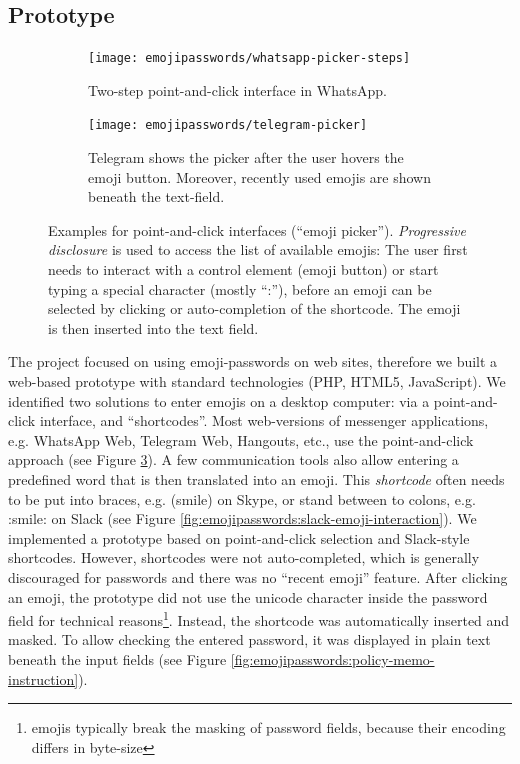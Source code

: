 \subsection{Prototype}
\begin{figure}
	\centering
	\begin{subfigure}[t]{0.49\textwidth}
		\texttt{[image: emojipasswords/whatsapp-picker-steps]}
		\caption{\label{fig:emojipasswords:whatsapp-point-and-click}Two-step point-and-click interface  in WhatsApp.}
	\end{subfigure}
	\begin{subfigure}[t]{0.49\textwidth}
		\texttt{[image: emojipasswords/telegram-picker]}
		\caption{\label{fig:emojipasswords:telegram-point-and-click} Telegram shows the picker after the user hovers  the emoji button. Moreover, recently used emojis are shown beneath the text-field.}
	\end{subfigure}
	
	\caption{\label{fig:emojipasswords:real-world-pickers}
		Examples for point-and-click interfaces (``emoji picker''). \textit{Progressive disclosure} is used to access
		the list of available emojis: The user first needs to interact with a control element (emoji button) or start typing a special character (mostly ``:''), before an emoji can be selected by clicking or auto-completion of the shortcode. The emoji is then inserted into the text field.
	} 
\end{figure}
The project focused on using emoji-passwords on web sites, therefore we built a web-based prototype with standard technologies (PHP, HTML5, JavaScript). We identified two solutions to enter emojis on a desktop computer: via a point-and-click interface, and ``shortcodes''. Most web-versions of messenger applications, e.g. WhatsApp Web, Telegram Web, Hangouts, etc., use the point-and-click approach (see Figure \ref{fig:emojipasswords:real-world-pickers}). A few communication tools also allow entering a predefined word that is then translated into an emoji. This \textit{shortcode} often needs to be put into braces, e.g. (smile) on Skype, or stand between to colons, e.g. :smile: on Slack (see Figure \ref{fig:emojipasswords:slack-emoji-interaction}). We implemented a prototype based on point-and-click selection and Slack-style shortcodes. However, shortcodes were not auto-completed, which is generally discouraged for passwords \cite{Melicher2016UsabilityMobileTextPasswords} and there was no ``recent emoji'' feature. 
After clicking an emoji, the prototype did not use the unicode character inside the password field for technical reasons\footnote{emojis typically break the masking of password fields, because their encoding differs in byte-size}. Instead, the shortcode was automatically inserted and masked. To allow checking the entered password, it was displayed in plain text beneath the input fields (see Figure \ref{fig:emojipasswords:policy-memo-instruction}). 

